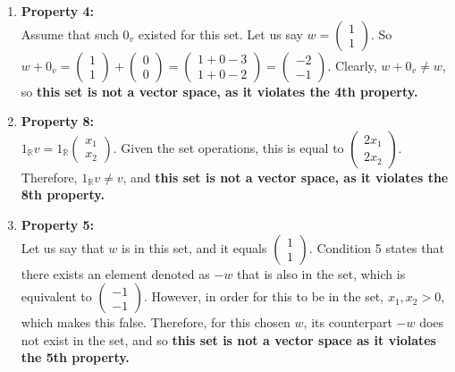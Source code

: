 \documentclass{article}
\begin{document}
\begin{enumerate}
\begin{enumerate}
\item \textbf{Property 4:} \\ Assume that such $0_v$ existed for this set. Let us say $w = \left(\begin{array}{c} 1 \\ 1 \end{array} \right)$. So $w + 0_v = 
\left(\begin{array}{c} 1 \\ 1 \end{array} \right) + \left(\begin{array}{c} 0 \\ 0 \end{array} \right)
= \left(\begin{array}{c} 1 + 0 - 3 \\ 1 + 0 - 2 \end{array} \right) = \left(\begin{array}{c} -2 \\ -1 \end{array} \right).$ Clearly, $w + 0_v \neq w$, so \textbf{this set is not a vector space, as it violates the 4th property.}

\item \textbf{Property 8:} \\ $1_\mathbb{R} v = 1_\mathbb{R} \left(\begin{array}{c} x_1 \\ x_2 \end{array} \right)$. Given the set operations, this is equal to $\left(\begin{array}{c} 2x_1 \\ 2x_2 \end{array} \right)$. Therefore, $1_{\mathbb{R}} v \neq v$, and \textbf{this set is not a vector space, as it violates the 8th property.}

\item \textbf{Property 5:} \\ Let us say that $w$ is in this set, and it equals $\left(\begin{array}{c} 1 \\ 1 \end{array} \right)$. Condition 5 states that there exists an element denoted as $-w$ that is also in the set, which is equivalent to $\left(\begin{array}{c} -1 \\ -1 \end{array} \right)$. However, in order for this to be in the set, $x_1, x_2 > 0$, which makes this false. Therefore, for this chosen $w$, its counterpart $-w$ does not exist in the set, and so \textbf{this set is not a vector space as it violates the 5th property.}


\end{enumerate}
\end{enumerate}
\end{document}
